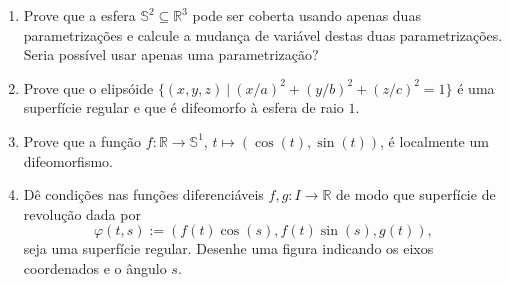 \documentclass[12pt,a4paper,oneside]{book}
\begin{document}
\begin{enumerate}

\item Prove que a esfera $\mathbb{S}^2\subseteq\mathbb{R}^3$ pode ser coberta 
	usando apenas duas parametriza\c c\~oes e calcule a mudan\c ca de vari\'avel destas
	duas parametriza\c c\~oes. Seria poss\'ivel usar apenas uma parametriza\c c\~ao?
	
\item Prove que o elips\'oide $\{(x,y,z) \ | \ (x/a)^2+(y/b)^2+(z/c)^2=1\}$ \'e uma superf\'icie regular
	e que \'e difeomorfo \`a esfera de raio $1$.
	
\item Prove que a fun\c c\~ao $f\colon \mathbb{R}\to \mathbb{S}^1$, $t\mapsto (\cos(t),\sin(t))$, \'e 	
	localmente um difeomorfismo.
	
\item D\^e condi\c c\~oes nas fun\c c\~oes diferenci\'aveis $f,g\colon I\to \mathbb{R}$ de modo que
	superf\'icie de revolu\c c\~ao dada por
	$$\varphi(t,s):=(f(t)\cos(s),f(t)\sin(s),g(t)),$$
	seja uma superf\'icie regular. Desenhe uma figura indicando os eixos coordenados e o \^angulo $s$.
\end{enumerate}
\end{document}
